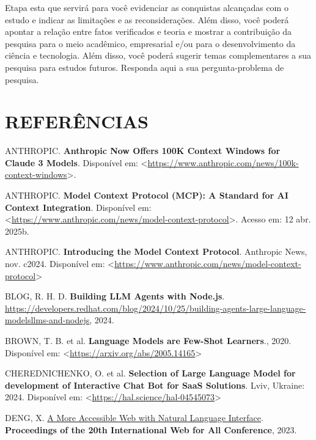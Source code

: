 \documentclass[
]{article}
\newlength{\cslhangindent}
\newenvironment{CSLReferences}[2] %
 {\begin{list}{}{%
  \setlength{\itemindent}{0pt}
  \setlength{\leftmargin}{0pt}
  \setlength{\parsep}{0pt}
  \ifodd #1
   \setlength{\leftmargin}{\cslhangindent}
   \setlength{\itemindent}{-1\cslhangindent}
  \fi
  \setlength{\itemsep}{#2\baselineskip}}}
 {\end{list}}
\begin{document}
Etapa esta que servirá para você evidenciar as conquistas alcançadas com
o estudo e indicar as limitações e as reconsiderações. Além disso, você
poderá apontar a relação entre fatos verificados e teoria e mostrar a
contribuição da pesquisa para o meio acadêmico, empresarial e/ou para o
desenvolvimento da ciência e tecnologia. Além disso, você poderá sugerir
temas complementares a sua pesquisa para estudos futuros. Responda aqui
a sua pergunta-problema de pesquisa.

\section*{REFERÊNCIAS}\label{referuxeancias}

\label{refs}
\begin{CSLReferences}{0}{1}
ANTHROPIC. \textbf{Anthropic Now Offers 100K Context Windows for Claude
3 Models}. Disponível em:
\textless{}\url{https://www.anthropic.com/news/100k-context-windows}\textgreater.

ANTHROPIC. \textbf{Model Context Protocol (MCP): A Standard for AI
Context Integration}. Disponível em:
\textless{}\url{https://www.anthropic.com/news/model-context-protocol}\textgreater.
Acesso em: 12 abr. 2025b.

ANTHROPIC. \textbf{{Introducing the Model Context Protocol}}. Anthropic
News, nov. c2024. Disponível em:
\textless{}\url{https://www.anthropic.com/news/model-context-protocol}\textgreater{}

BLOG, R. H. D. \textbf{Building LLM Agents with Node.js}.
\url{https://developers.redhat.com/blog/2024/10/25/building-agents-large-language-modelsllms-and-nodejs},
2024.

BROWN, T. B. et al. \textbf{Language Models are Few-Shot Learners}.,
2020. Disponível em:
\textless{}\url{https://arxiv.org/abs/2005.14165}\textgreater{}

CHEREDNICHENKO, O. et al. \textbf{Selection of Large Language Model for
development of Interactive Chat Bot for SaaS Solutions}. Lviv, Ukraine:
2024. Disponível em:
\textless{}\url{https://hal.science/hal-04545073}\textgreater{}

DENG, X. \href{https://api.semanticscholar.org/CorpusID:258259387}{A
More Accessible Web with Natural Language Interface}.
\textbf{Proceedings of the 20th International Web for All Conference},
2023.


\end{CSLReferences}
\end{document}
